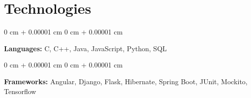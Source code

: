 \documentclass[30pt, a4paper]{article}
\newenvironment{onecolentry}{
    \begin{adjustwidth}{
        0 cm + 0.00001 cm
    }{
        0 cm + 0.00001 cm
    }
}{
    \end{adjustwidth}
} %
\begin{document}
    \section{Technologies}
        
        \begin{onecolentry}
            \textbf{Languages:} C, C++, Java, JavaScript, Python, SQL \end{onecolentry}

        \vspace{0.2 cm}

        \begin{onecolentry}
            \textbf{Frameworks:} Angular, Django, Flask, Hibernate, Spring Boot, JUnit, Mockito, Tensorflow
        \end{onecolentry}  
\end{document}
